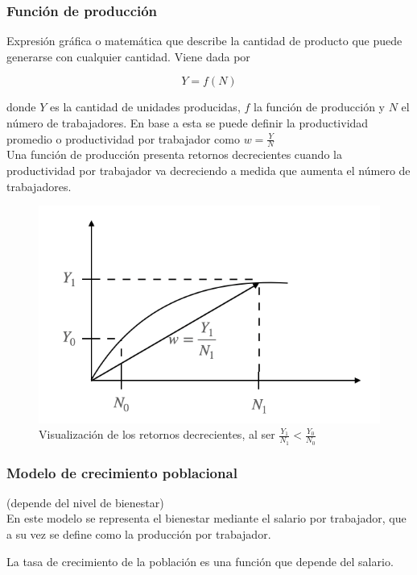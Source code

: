 \subsubsection{Función de producción}
Expresión gráfica o matemática que describe la cantidad de producto que puede generarse con cualquier cantidad. Viene dada por

\[Y = f(N)\]

donde $Y$ es la cantidad de unidades producidas, $f$ la función de producción y $N$ el número de trabajadores. En base a esta se puede definir la productividad promedio o productividad por trabajador como $w = \frac{Y}{N}$
\\

Una función de producción presenta retornos decrecientes cuando la productividad por trabajador va decreciendo a medida que aumenta el número de trabajadores. 

\begin{figure}[H]
    \centering
    \includegraphics{Modulo_1/retornos_decrecientes.png}
    \caption{Visualización de los retornos decrecientes, al ser $\frac{Y_1}{N_1} < \frac{Y_0}{N_0}$}
\end{figure}

\subsubsection{Modelo de crecimiento poblacional} (depende del nivel de bienestar)
\\

En este modelo se representa el bienestar mediante el salario por trabajador, que a su vez se define como la producción por trabajador.

La tasa de crecimiento de la población es una función que depende del salario.
\\

